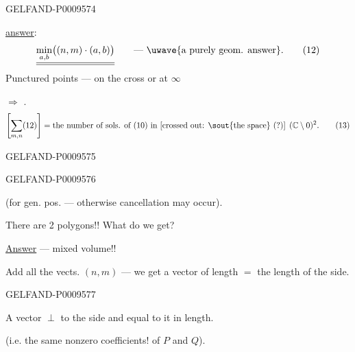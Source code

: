 \begin{GelfandAdjacentEvidence}{GELFAND-P000957}{4}


\underline{answer}:
\begin{equation*}
 \underline{\underline{\min_{a,b}\bigl((n,m)\cdot(a,b)\bigr)}}
 \qquad\text{--- \uwave{a purely geom. answer}.}
 \tag{12}
\end{equation*}
Punctured points --- on the cross or at $\infty$

$\Rightarrow$ .
\begin{equation*}
 \left[\sum_{m,n}(12)\right]
 =\text{the number of sols. of (10) in [crossed out: \sout{the space} (?)] }(\mathbb C\setminus0)^2.
 \tag{13}
\end{equation*}
\end{GelfandAdjacentEvidence}
\begin{GelfandAdjacentEvidence}{GELFAND-P000957}{5}

\end{GelfandAdjacentEvidence}
\begin{GelfandAdjacentEvidence}{GELFAND-P000957}{6}


(for gen. pos. --- otherwise cancellation may occur).

There are 2 polygons!! What do we get?

\underline{Answer} --- mixed volume!!

Add all the vects. $(n,m)$ --- we get a vector of length $=$ the length of the side.

\end{GelfandAdjacentEvidence}
\begin{GelfandAdjacentEvidence}{GELFAND-P000957}{7}


A vector $\perp$ to the side and equal to it in length.

 (i.e. the same nonzero coefficients! of $P$ and $Q$).
\end{GelfandAdjacentEvidence}
